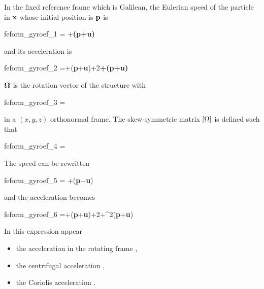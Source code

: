In the fixed reference frame which is Galilean, the Eulerian speed of the particle in ${\bf x}$ whose initial position is ${\bf p}$ is
%
\begin{eqsvg}{feform_gyroef_1}
= +\bf{\Omega}\wedge({\bf p}+{\bf u})
\end{eqsvg}
%
and its acceleration is
%
\begin{eqsvg}{feform_gyroef_2}
 =+\wedge({\bf p}+{\bf u})+2\bf{\Omega}\wedge{}+\bf{\Omega}\wedge\bf{\Omega}\wedge({\bf p}+{\bf u})
\end{eqsvg}
%
${\bf \Omega} $ is the rotation vector of the structure with 
%
\begin{eqsvg}{feform_gyroef_3}
{\bf \Omega}=
\end{eqsvg}
%
in a $(x,y,z)$ orthonormal frame.
The skew-symmetric matrix $\left[\Omega\right]$ is defined such that
%
\begin{eqsvg}{feform_gyroef_4}
\ma{\Omega} = 
\end{eqsvg}
%
The speed can be rewritten
%
\begin{eqsvg}{feform_gyroef_5}
= +\ma{\Omega}({\bf p}+{\bf u}) 
\end{eqsvg}
%
and the acceleration becomes
%
\begin{eqsvg}{feform_gyroef_6}
 =+({\bf p}+{\bf u})+2\ma{\Omega}+\ma{\Omega}^2({\bf p}+{\bf u})
\end{eqsvg}
%
In this expression appear
\begin{itemize}
\item the acceleration in the rotating frame ,
\item the centrifugal acceleration ,
\item the Coriolis acceleration .
\end{itemize}

